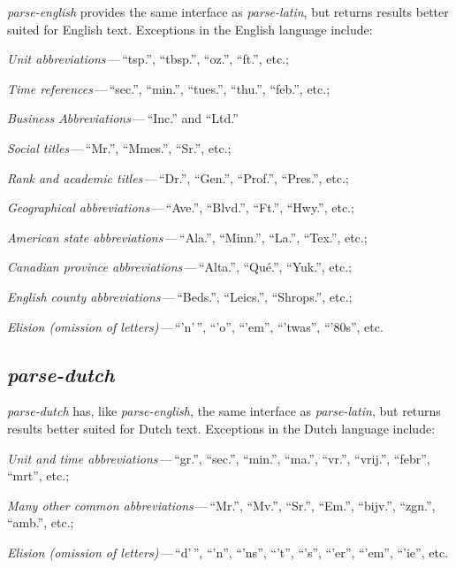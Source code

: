 \emph{parse-english} provides the same interface as \emph{parse-latin}, but
  returns results better suited for English text.
Exceptions in the English language include:

\begin{aenumerate}
\item \emph{Unit abbreviations}\,---\,``tsp.'', ``tbsp.'', ``oz.'', ``ft.'',
  etc.;
\item\emph{Time references}\,---\,``sec.'', ``min.'', ``tues.'', ``thu.'',
  ``feb.'', etc.;
\item\emph{Business Abbreviations}\,---\,``Inc.'' and ``Ltd.''
\item\emph{Social titles}\,---\,``Mr.'', ``Mmes.'', ``Sr.'', etc.;
\item\emph{Rank and academic titles}\,---\,``Dr.'', ``Gen.'', ``Prof.'',
  ``Pres.'', etc.;
\item\emph{Geographical abbreviations}\,---\,``Ave.'', ``Blvd.'', ``Ft.'',
  ``Hwy.'', etc.;
\item\emph{American state abbreviations}\,---\,``Ala.'', ``Minn.'', ``La.'',
  ``Tex.'', etc.;
\item\emph{Canadian province abbreviations}\,---\,``Alta.'', ``Qué.'',
  ``Yuk.'', etc.;
\item\emph{English county abbreviations}\,---\,``Beds.'', ``Leics.'',
  ``Shrops.'', etc.;
\item\emph{Elision (omission of letters)}\,---\,``'n'\,'', ``'o'', ``'em'',
  ``'twas'', ``'80s'', etc.
\end{aenumerate}

\subsection{\emph{parse-dutch}}\label{parse-dutch}

\emph{parse-dutch} has, like \emph{parse-english}, the same interface as
  \emph{parse-latin}, but returns results better suited for Dutch text.
Exceptions in the Dutch language include:

\begin{aenumerate}
\item\emph{Unit and time abbreviations}\,---\,``gr.'', ``sec.'', ``min.'', ``ma.'',
  ``vr.'', ``vrij.'', ``febr'', ``mrt'', etc.;
\item\emph{Many other common abbreviations}\,---\,``Mr.'', ``Mv.'', ``Sr.'',
  ``Em.'', ``bijv.'', ``zgn.'', ``amb.'', etc.;
\item\emph{Elision (omission of letters)}\,---\,``d'\,'', ``'n'', ``'ns'',
  ``'t'', ``'s'', ``'er'', ``'em'', ``'ie'', etc.
\end{aenumerate}

